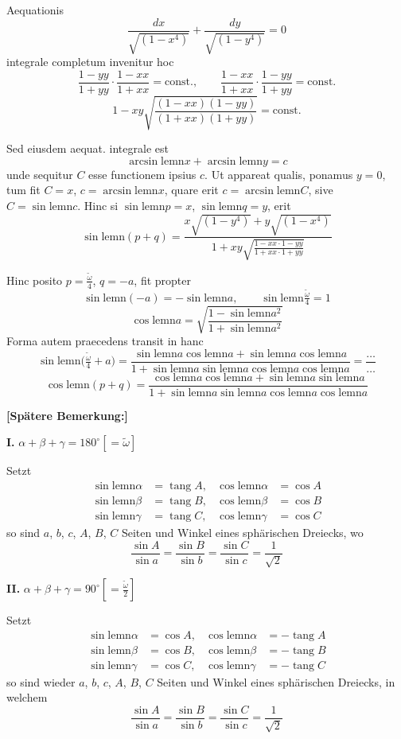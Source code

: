 \documentclass[10pt,a4paper]{article}
\newcommand{\lemn}{\text{lemn}}
\newcommand{\sinlemn}{\sin\lemn}
\newcommand{\coslemn}{\cos\lemn}
\newcommand{\arcsinlemn}{\arcsin\lemn}
\DeclareMathOperator{\tg}{tang}
\begin{document}
Aequationis
\[
\frac{dx}{\sqrt{(1-x^4)}} + \frac{dy}{\sqrt{(1-y^4)}} = 0
\]
integrale completum invenitur hoc
\[
\frac{1-yy}{1+yy} \cdot \frac{1-xx}{1+xx} = \text{const.}, \qquad
\frac{1-xx}{1+xx} \cdot \frac{1-yy}{1+yy} = \text{const.}
\]
\[
1 - xy\sqrt{\frac{(1-xx)(1-yy)}{(1+xx)(1+yy)}} = \text{const.}
\]

Sed eiusdem aequat. integrale est
\[
\arcsinlemn x + \arcsinlemn y = c
\]
unde sequitur $C$ esse functionem ipsius $c$. Ut appareat qualis, ponamus $y=0$,
tum fit $C=x$, $c=\arcsinlemn x$, quare erit $c=\arcsinlemn C$, sive
$C=\sinlemn c$. Hinc si $\sinlemn p = x$, $\sinlemn q = y$, erit
\[
\sinlemn(p+q) = \frac{x\sqrt{(1-y^4)}+y\sqrt{(1-x^4)}}{1+xy\sqrt{\frac{1-xx\cdot 1-yy}{1+xx\cdot 1+yy}}}
\]

Hinc posito $p=\frac{\tilde{\omega}}{4}$, $q=-a$, fit propter
\[
\sinlemn(-a) = -\sinlemn a, \qquad \sinlemn\tfrac{\tilde{\omega}}{4} = 1
\]
\[
\coslemn a = \sqrt{\frac{1-\sinlemn a^2}{1+\sinlemn a^2}}
\]
Forma autem praecedens transit in hanc
\[
\sinlemn\bigl(\tfrac{\tilde{\omega}}{4}+a\bigr) = \frac{\sinlemn a\coslemn a + \sinlemn a\coslemn a}{1+\sinlemn a\sinlemn a\coslemn a\coslemn a} = \frac{\ldots}{\ldots}
\]
\[
\coslemn(p+q) = \frac{\coslemn a\coslemn a + \sinlemn a\sinlemn a}{1+\sinlemn a\sinlemn a\coslemn a\coslemn a}
\]

\medskip
\noindent\textbf{[Spätere Bemerkung:]}

\medskip
\noindent\textbf{I.} $\alpha+\beta+\gamma = 180^\circ[=\tilde{\omega}]$

Setzt
\begin{align*}
\sinlemn\alpha &= \tg A, & \coslemn\alpha &= \cos A\\
\sinlemn\beta &= \tg B, & \coslemn\beta &= \cos B\\
\sinlemn\gamma &= \tg C, & \coslemn\gamma &= \cos C
\end{align*}
so sind $a$, $b$, $c$, $A$, $B$, $C$ Seiten und Winkel eines sphärischen Dreiecks, wo
\[
\frac{\sin A}{\sin a} = \frac{\sin B}{\sin b} = \frac{\sin C}{\sin c} = \frac{1}{\sqrt{2}}
\]

\medskip
\noindent\textbf{II.} $\alpha+\beta+\gamma = 90^\circ[=\tfrac{\tilde{\omega}}{2}]$

Setzt
\begin{align*}
\sinlemn\alpha &= \cos A, & \coslemn\alpha &= -\tg A\\
\sinlemn\beta &= \cos B, & \coslemn\beta &= -\tg B\\
\sinlemn\gamma &= \cos C, & \coslemn\gamma &= -\tg C
\end{align*}
so sind wieder $a$, $b$, $c$, $A$, $B$, $C$
Seiten und Winkel eines sphärischen Dreiecks,
in welchem
\[
\frac{\sin A}{\sin a} = \frac{\sin B}{\sin b} = \frac{\sin C}{\sin c} = \frac{1}{\sqrt{2}}
\]
\end{document}
